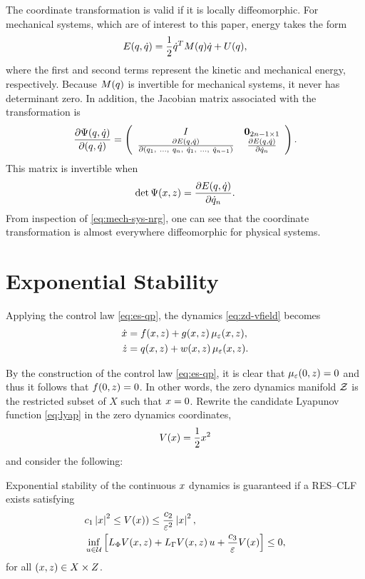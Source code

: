 %
The coordinate transformation is valid if it is locally diffeomorphic.
%
For mechanical systems, which are of interest to this paper, energy takes the form
%
\begin{align}
  \label{eq:mech-sys-nrg}
  E(q, \dot{q}) = \frac{1}{2} \dot{q}^{T} M(q) \dot{q} + U(q),
\end{align}
%
where the first and second terms represent the kinetic and mechanical energy, respectively.
%
Because $M(q)$ is invertible for mechanical systems, it never has determinant zero.
%
In addition, the Jacobian matrix associated with the transformation is
\begin{align}
  \frac{\partial{\Psi(q, \dot{q})}}{\partial{(q, \dot{q})}} =
  \left(\begin{array}{c c}
    I & {\mathbf 0}_{2n-1 \times 1}\\
    \frac{\partial{E(q, \dot{q})}}{\partial{(q_{1}, \ \ldots, \ q_{n}, \ \dot{q}_{1}, \ \ldots, \ \dot{q}_{n-1})}} & \frac{\partial{E(q, \dot{q})}}{\partial{\dot{q}_{n}}}
  \end{array}\right).
\end{align}
%
This matrix is invertible when
\begin{align*}
  \det \Psi(x, z) = \frac{\partial{E(q, \dot{q})}}{\partial{\dot{q}_{n}}}.
\end{align*}
From inspection of \eqref{eq:mech-sys-nrg}, one can see that the coordinate transformation is almost everywhere diffeomorphic for physical systems.

\section{Exponential Stability}

Applying the control law \eqref{eq:es-qp}, the dynamics \eqref{eq:zd-vfield} becomes
%
\begin{align}
  \nonumber
  \dot {x} &= f(x, z) + g(x, z) \, \mu_{\varepsilon}(x, z),\\
  \dot {z} &= q(x, z) + w(x, z) \, \mu_{\varepsilon}(x, z).
  \label{eq:zd-vfield-cl}
\end{align}

By the construction of the control law \eqref{eq:es-qp}, it is clear that $\mu_{\varepsilon}(0, z) = 0$ and thus it follows that $f(0, z) = 0$.
%
In other words, the zero dynamics manifold $\mathcal{Z}$ is the restricted subset of $X$ such that $x = 0$.
%
Rewrite the candidate Lyapunov function \eqref{eq:lyap} in the zero dynamics coordinates,
%
\begin{align}
  V(x) = \frac{1}{2} x^{2}
\end{align}
and consider the following:\vgap

\begin{proposition}  
  \label{prop:res-clf}
  Exponential stability of the continuous $x$ dynamics is guaranteed if a RES--CLF exists satisfying
  \begin{eqnarray}
    \label{eq:lyap-cond-nrg-es}
    &c_{1} \left|x\right|^{2} \leq V(x)) \leq \frac{c_{2}}{\varepsilon^{2}} \left|x\right|^2,\\
    \nonumber
    &\inf_{u \in \mathcal{U}} \left[ L_{\Phi} V(x, z) + L_{\Gamma} V(x, z) \, u + \frac{c_{3}}{\varepsilon} V(x) \right] \leq 0,
  \end{eqnarray}
  for all $(x, z) \in X \times Z$.\vgap
\end{proposition}


